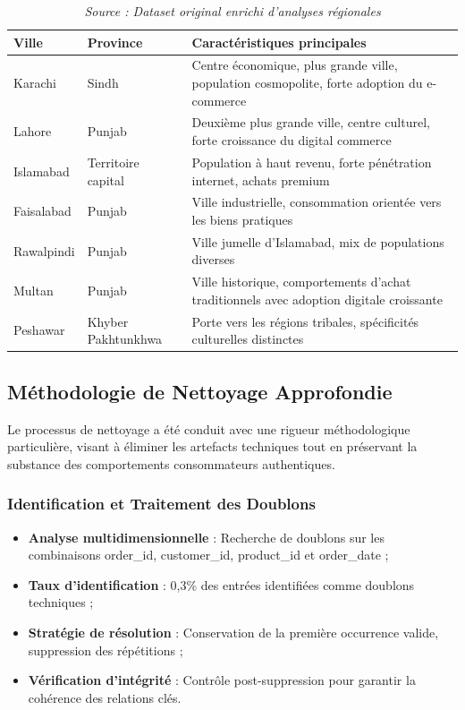 \documentclass[a4paper,12pt]{article}
\begin{document}
\begin{table}[H]
\centering
\begin{tabular}{|l|l|p{8cm}|}
\hline
\textbf{Ville} & \textbf{Province} & \textbf{Caractéristiques principales} \\
\hline
Karachi & Sindh & Centre économique, plus grande ville, population cosmopolite, forte adoption du e-commerce \\
\hline
Lahore & Punjab & Deuxième plus grande ville, centre culturel, forte croissance du digital commerce \\
\hline
Islamabad & Territoire capital & Population à haut revenu, forte pénétration internet, achats premium \\
\hline
Faisalabad & Punjab & Ville industrielle, consommation orientée vers les biens pratiques \\
\hline
Rawalpindi & Punjab & Ville jumelle d'Islamabad, mix de populations diverses \\
\hline
Multan & Punjab & Ville historique, comportements d'achat traditionnels avec adoption digitale croissante \\
\hline
Peshawar & Khyber Pakhtunkhwa & Porte vers les régions tribales, spécificités culturelles distinctes \\
\hline
\end{tabular}
\caption{Caractéristiques détaillées des villes pakistanaises du dataset}
\caption*{\textit{Source : Dataset original enrichi d'analyses régionales}}
\label{tab:profil_villes_pakistanaises}
\end{table}

\subsection{Méthodologie de Nettoyage Approfondie}

Le processus de nettoyage a été conduit avec une rigueur méthodologique particulière, visant à éliminer les artefacts techniques tout en préservant la substance des comportements consommateurs authentiques.

\subsubsection{Identification et Traitement des Doublons}
\begin{itemize}
    \item \textbf{Analyse multidimensionnelle} : Recherche de doublons sur les combinaisons order\_id, customer\_id, product\_id et order\_date ;
    \item \textbf{Taux d'identification} : 0,3\% des entrées identifiées comme doublons techniques ;
    \item \textbf{Stratégie de résolution} : Conservation de la première occurrence valide, suppression des répétitions ;
    \item \textbf{Vérification d'intégrité} : Contrôle post-suppression pour garantir la cohérence des relations clés.
\end{itemize}
\end{document}
